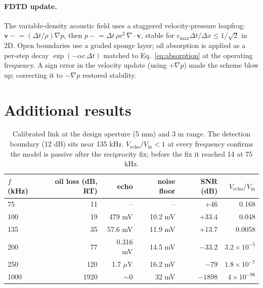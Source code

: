 \paragraph{FDTD update.} The variable-density acoustic field uses a staggered velocity-pressure
leapfrog: $\mathbf{v}\mathrel{-}= (\Delta t/\rho)\nabla p$, then
$p \mathrel{-}= \Delta t\,\rho c^2\,\nabla\!\cdot\mathbf{v}$, stable for
$c_{\max}\Delta t/\Delta x \le 1/\sqrt 2$ in 2D. Open boundaries use a graded sponge layer; oil
absorption is applied as a per-step decay $\exp(-\alpha c\,\Delta t)$ matched to
Eq.~\eqref{eq:absorption} at the operating frequency. A sign error in the velocity update (using
$+\nabla p$) made the scheme blow up; correcting it to $-\nabla p$ restored stability.

\section{Additional results}\label{app:results}
\begin{table}[h]
\centering\small
\begin{tabular}{lrrrrr}
\toprule
$f$ (kHz) & oil loss (dB, RT) & echo & noise floor & SNR (dB) & $V_{\mathrm{echo}}/V_{\mathrm{in}}$ \\
\midrule
75  & 11  & --       & --      & +46  & 0.168 \\
100 & 19  & 479 mV   & 10.2 mV & +33.4 & 0.048 \\
135 & 35  & 57.6 mV  & 11.9 mV & +13.7 & 0.0058 \\
200 & 77  & 0.316 mV & 14.5 mV & $-33.2$ & $3.2\times10^{-5}$ \\
250 & 120 & 1.7 $\mu$V & 16.2 mV & $-79$ & $1.8\times10^{-7}$ \\
1000& 1920 & $\sim$0 & 32 mV   & $-1898$ & $4\times10^{-98}$ \\
\bottomrule
\end{tabular}
\caption{Calibrated link at the design aperture (5 mm) and 3 m range. The detection boundary
(12 dB) sits near 135 kHz. $V_{\mathrm{echo}}/V_{\mathrm{in}}<1$ at every frequency confirms the
model is passive after the reciprocity fix; before the fix it reached 14 at 75 kHz.}
\end{table}

